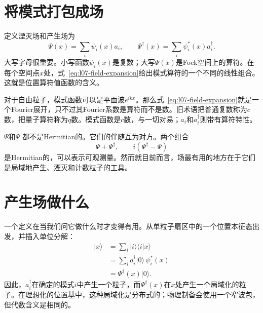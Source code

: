 \section{将模式打包成场}

定义湮灭场和产生场为
\begin{equation}
\Psi(x)=\sum_i \psi_i(x)a_i,
\qquad
\Psi^\dagger(x)=\sum_i \psi_i^*(x)a_i^\dagger.
\label{eq:l07-field-expansion}
\end{equation}
大写字母很重要。小写函数\(\psi_i(x)\)是复数；大写\(\Psi(x)\)是Fock空间上的算符。在每个空间点\(x\)处，式~\eqref{eq:l07-field-expansion}给出模式算符的一个不同的线性组合。这就是位置算符值函数的含义。

对于自由粒子，模式函数可以是平面波\(e^{ikx}\)。那么式~\eqref{eq:l07-field-expansion}就是一个Fourier展开，只不过其Fourier系数是算符而不是数。旧术语把普通复数称为\(c\)数，把量子算符称为\(q\)数。模式函数是\(c\)数，与一切对易；\(a_i\)和\(a_i^\dagger\)则带有算符特性。

\(\Psi\)和\(\Psi^\dagger\)都不是Hermitian的。它们的伴随互为对方。两个组合
\begin{equation}
\Psi+\Psi^\dagger,
\qquad
i(\Psi^\dagger-\Psi)
\label{eq:l07-hermitian-combinations}
\end{equation}
是Hermitian的，可以表示可观测量。然而就目前而言，场最有用的地方在于它们是局域地产生、湮灭和计数粒子的工具。

\begin{classroomqa}
\end{classroomqa}

\section{产生场做什么}

一个定义在当我们问它做什么时才变得有用。从单粒子扇区中的一个位置本征态出发，并插入单位分解：
\begin{align}
|x\rangle
&=\sum_i |i\rangle\langle i|x\rangle \\
&=\sum_i a_i^\dagger|0\rangle\,\psi_i^*(x) \\
&=\Psi^\dagger(x)|0\rangle.
\label{eq:l07-local-creation}
\end{align}
因此，\(a_i^\dagger\)在确定的模式\(i\)中产生一个粒子，而\(\Psi^\dagger(x)\)在\(x\)处产生一个局域化的粒子。在理想化的位置基中，这种局域化是分布式的；物理制备会使用一个窄波包，但代数含义是相同的。

